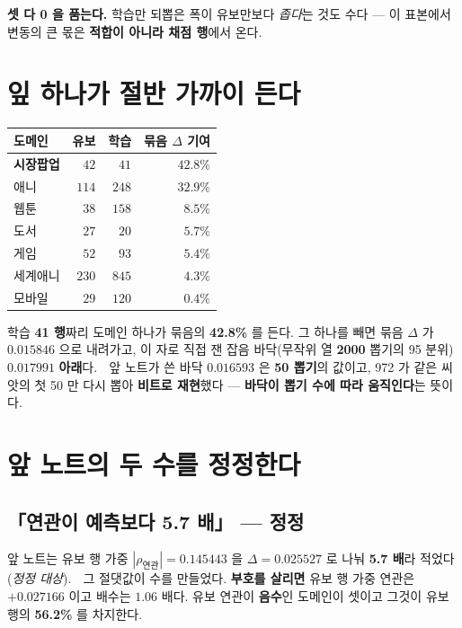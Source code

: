 \documentclass[10pt]{article}
\begin{document}
\textbf{셋 다 0 을 품는다.} 학습만 되뽑은 폭이 유보만보다 \emph{좁다}는 것도 수다 ---
이 표본에서 변동의 큰 몫은 \textbf{적합이 아니라 채점 행}에서 온다.

\section{잎 하나가 절반 가까이 든다}

\begin{center}\tsize
\begin{tabular}{lrrr}
\toprule
도메인 & 유보 & 학습 & 묶음 $\Delta$ 기여 \\
\midrule
\textbf{시장팝업} & $42$ & $41$ & $\mathbf{42.8\%}$ \\
애니 & $114$ & $248$ & $32.9\%$ \\
웹툰 & $38$ & $158$ & $8.5\%$ \\
도서 & $27$ & $20$ & $5.7\%$ \\
게임 & $52$ & $93$ & $5.4\%$ \\
세계애니 & $230$ & $845$ & $4.3\%$ \\
모바일 & $29$ & $120$ & $0.4\%$ \\
\bottomrule
\end{tabular}
\end{center}

학습 \textbf{41 행}짜리 도메인 하나가 묶음의 \textbf{42.8\%} 를 든다.
그 하나를 빼면 묶음 $\Delta$ 가 $\mathbf{0.015846}$ 으로 내려가고,
이 자로 직접 잰 잡음 바닥(무작위 열 \textbf{2000} 뽑기의 95 분위) $\mathbf{0.017991}$ \textbf{아래}다.
🔴 앞 노트가 쓴 바닥 $0.016593$ 은 \textbf{50 뽑기}의 값이고, 972 가 같은 씨앗의 첫 50 만
다시 뽑아 \textbf{비트로 재현}했다 --- \textbf{바닥이 뽑기 수에 따라 움직인다}는 뜻이다.

\section{앞 노트의 두 수를 정정한다}

\subsection{「연관이 예측보다 5.7 배」 --- 정정}

앞 노트는 유보 행 가중 $|\rho_{\text{연관}}| = 0.145443$ 을 $\Delta = 0.025527$ 로 나눠
\textbf{5.7 배}라 적었다(\emph{정정 대상}). 🔴 그 절댓값이 수를 만들었다.
\textbf{부호를 살리면} 유보 행 가중 연관은 $\mathbf{+0.027166}$ 이고 배수는 $\mathbf{1.06}$ 배다.
유보 연관이 \textbf{음수}인 도메인이 셋이고 그것이 유보 행의 \textbf{56.2\%} 를 차지한다.
\end{document}
